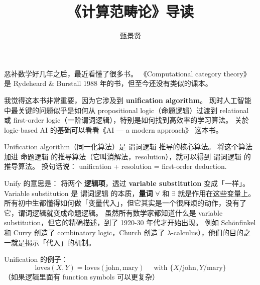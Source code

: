 \documentclass[12pt, orivec]{article}
\title{《计算范畴论》导读}
\author{甄景贤}
\begin{document}
\setlength{\parindent}{0pt}
\setlength{\parskip}{2.8ex plus0.8ex minus0.8ex}

\maketitle

恶补数学好几年之后，最近看懂了很多书。 《Computational category theory》 
是 Rydeheard \& Burstall 1988 年的书，但至今还没有类似的课本。  

我觉得这本书非常重要，因为它涉及到 \textbf{unification algorithm}。  现时人工智能中最关键的问题似乎是如何从 propositional logic（命题逻辑）过渡到 relational 或 first-order logic（一阶谓词逻辑），特别是如何找到高效率的学习算法。  关於 logic-based AI 的基础可以看看《AI --- a modern approach》 这本书。  

Unification algorithm（同一化算法）是 谓词逻辑 推导的核心算法。  将这个算法加进 命题逻辑 的推导算法（它叫消解法，resolution），就可以得到 谓词逻辑 的推导算法。  换句话说： unification + resolution = first-order deduction.

Unify 的意思是： 将两个 \textbf{逻辑项}，透过 \textbf{variable substitution} 变成「一样」。  Variable substitution 是 谓词逻辑 的本质，\textbf{量词} $\forall$ 和 $\exists$ 就是作用在这些变量上。  所有初中生都懂得如何做「变量代入」，但它其实是一个很麻烦的动作，没有了它，谓词逻辑就变成命题逻辑。  虽然所有数学家都知道什么是 variable substitution，但它的精确描述，到了 1920-30 年代才开始出现。 例如 Sch\"{o}nfinkel 和 Curry 创造了 combinatory logic，Church 创造了 $\lambda$-calculus），他们的目的之一就是揭示「代入」的机制。 

Unification 的例子：
\begin{equation}
\mbox{loves}(X,Y) = \mbox{loves}(\mbox{john}, \mbox{mary}) \quad \mbox{ with } \{ X/\mbox{john}, Y/\mbox{mary} \}
\end{equation}
（如果逻辑里面有 function symbols 可以更复杂）
\end{document}
